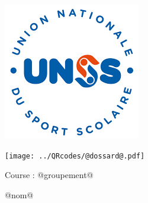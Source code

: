 \Huge

\begin{block} %
{}\hfill {}
{}\hfill {}
\begin{minipage}{0.15\linewidth}
\includegraphics[width=\textwidth]{../logo-UNSS.png}
\end{minipage}
{}\hfill {}



\begin{minipage}{0.48\linewidth}
\texttt{[image: ../QRcodes/@dossard@.pdf]}

\vspace{0.5cm}

Course : @groupement@
\end{minipage}
\begin{minipage}{0.5\linewidth}
{}\hfill {}
{}\hfill {}

\bigskip

\begin{center}
@nom@


\end{center}
\end{minipage}
\end{block}
